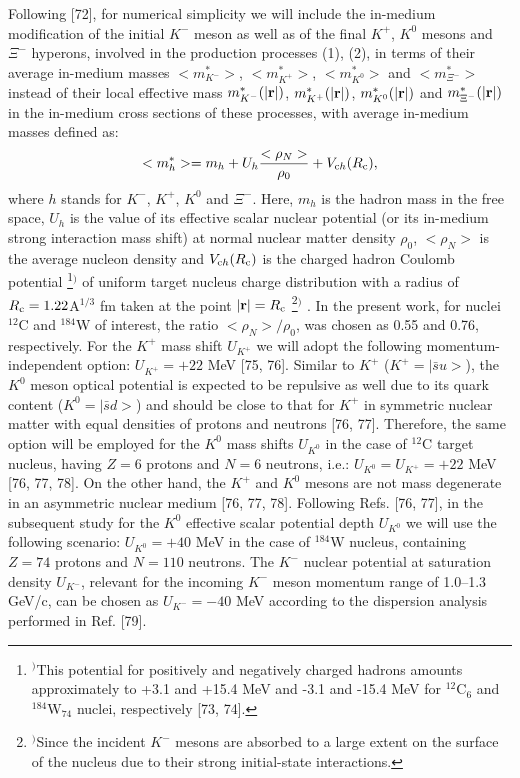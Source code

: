 \documentclass[12pt]{article}
\begin{document}
Following [72], for numerical simplicity we will include the in-medium modification of the initial $K^-$
meson as well as of the final $K^+$, $K^0$ mesons and $\Xi^-$ hyperons,
involved in the production processes (1), (2),
in terms of their average in-medium masses $<m_{K^-}^*>$, $<m_{K^+}^*>$, $<m_{K^0}^*>$ and $<m_{\Xi^-}^*>$
instead of their local effective mass $m_{K^-}^*(|{\bf r}|)$, $m_{K^+}^*(|{\bf r}|)$, $m_{K^0}^*(|{\bf r}|)$
and $m_{\Xi^-}^*(|{\bf r}|)$ in the in-medium cross sections
of these processes, with average in-medium masses defined as:
\begin{equation}
<m^*_{h}>=m_{h}+U_h\frac{<{\rho_N}>}{{\rho_0}}+V_{{\rm c}h}(R_{\rm c}),
\end{equation}
where $h$ stands for $K^-$, $K^+$, $K^0$ and $\Xi^-$.
Here, $m_{h}$ is the hadron mass in the free space, $U_h$ is the value of its effective scalar
nuclear potential (or its in-medium strong interaction mass shift) at normal nuclear matter
density ${\rho_0}$, $<{\rho_N}>$ is the average nucleon density and $V_{{\rm c}h}(R_{\rm c})$
is the charged hadron Coulomb potential
\footnote{$^)$This potential for positively and negatively charged hadrons amounts approximately
to +3.1 and +15.4 MeV and -3.1 and -15.4 MeV for $^{12}$C$_{6}$ and $^{184}$W$_{74}$ nuclei,
respectively [73, 74].}$^)$
of uniform target nucleus charge distribution with a radius
of $R_{\rm c}=1.22$A$^{1/3}$ fm taken at the point $|{\bf r}|=R_{\rm c}$
\footnote{$^)$Since the incident $K^-$ mesons are absorbed to a large extent on the surface of the
nucleus due to their strong initial-state interactions.}$^)$
.
In the present work, for nuclei $^{12}$C and $^{184}$W of interest,  the ratio $<{\rho_N}>/{\rho_0}$,
was chosen as 0.55 and 0.76, respectively. For the $K^+$ mass shift $U_{K^+}$
we will adopt the following momentum-independent option: $U_{K^+}=+22$ MeV [75, 76].
Similar to $K^+$ ($K^+=|{\bar s}u>$),
the $K^0$ meson optical potential is expected to be repulsive as well due to its quark content
($K^0=|{\bar s}d>$) and should be close to that for $K^+$ in symmetric nuclear matter with equal
densities of protons and neutrons [76, 77]. Therefore, the same option will be employed
for the $K^0$ mass shifts $U_{K^0}$ in the case of $^{12}$C target nucleus,
having $Z=6$ protons and $N=6$ neutrons, i.e.: $U_{K^0}=U_{K^+}=+22$ MeV [76, 77, 78].
On the other hand, the $K^+$ and $K^0$ mesons are not mass degenerate
in an asymmetric nuclear medium [76, 77, 78]. Following Refs. [76, 77], in the subsequent study for the $K^0$
effective scalar potential depth $U_{K^0}$ we will use the following scenario: $U_{K^0}=+40$ MeV in
the case of $^{184}$W nucleus, containing $Z=74$ protons and $N=110$ neutrons. The $K^-$ nuclear potential
at saturation density $U_{K^-}$, relevant for the incoming $K^-$ meson momentum range of 1.0--1.3 GeV/c,
can be chosen as $U_{K^-}=-40$ MeV according to the dispersion analysis performed in Ref. [79].
\end{document}
